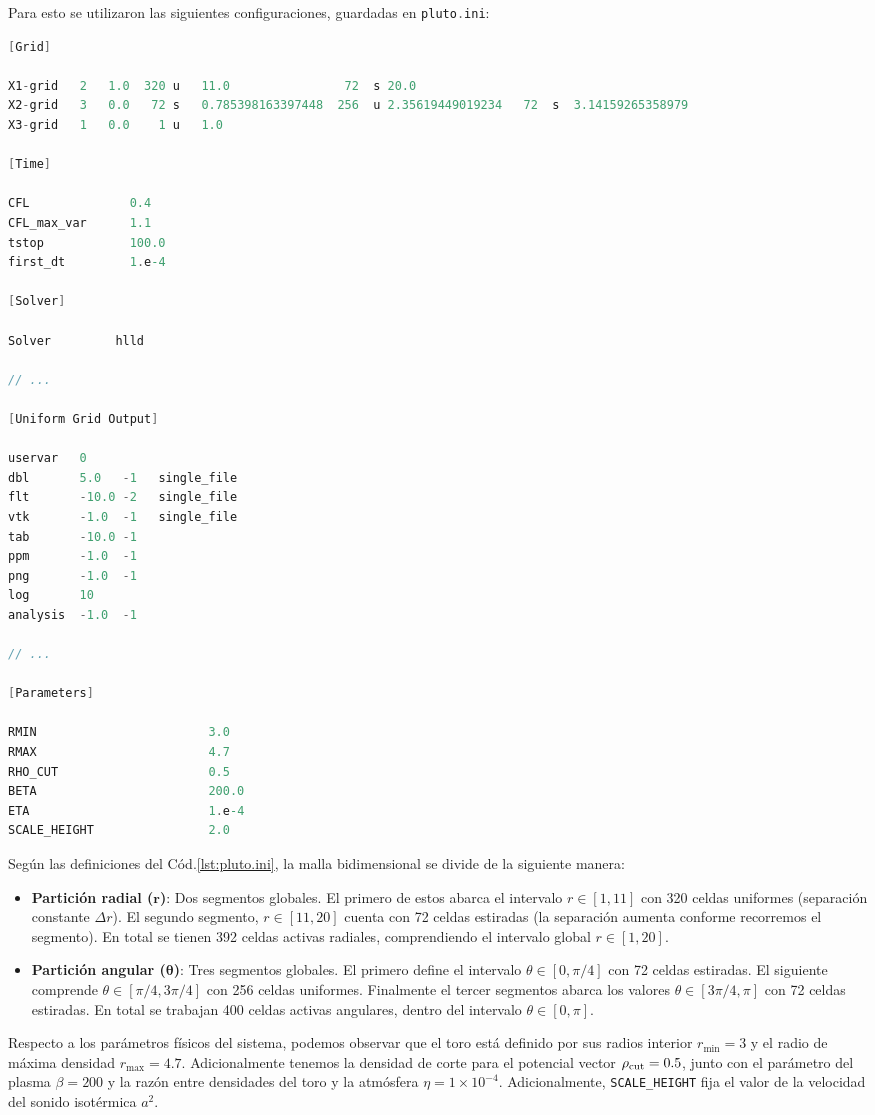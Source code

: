 \documentclass[11pt, letterpaper]{article}
\begin{document}
Para esto se utilizaron las siguientes configuraciones, guardadas en \lstinline[language=C]{pluto.ini}:
\begin{lstlisting}[language=C, caption={Parámetros de grilla, tiempo y solucionador para simulación del toro por PLUTO}, label={lst:pluto.ini}]
[Grid]

X1-grid   2   1.0  320 u   11.0                72  s 20.0
X2-grid   3   0.0   72 s   0.785398163397448  256  u 2.35619449019234   72  s  3.14159265358979
X3-grid   1   0.0    1 u   1.0

[Time]

CFL              0.4
CFL_max_var      1.1
tstop            100.0
first_dt         1.e-4

[Solver]

Solver         hlld

// ...

[Uniform Grid Output]

uservar   0
dbl       5.0   -1   single_file
flt       -10.0 -2   single_file
vtk       -1.0  -1   single_file
tab       -10.0 -1   
ppm       -1.0  -1   
png       -1.0  -1   
log       10 
analysis  -1.0  -1 
  
// ...

[Parameters]

RMIN                        3.0  
RMAX                        4.7  
RHO_CUT                     0.5  
BETA                        200.0  
ETA                         1.e-4  
SCALE_HEIGHT                2.0  
\end{lstlisting}
Según las definiciones del Cód.\ref{lst:pluto.ini}, la malla bidimensional se divide de la siguiente manera:
\begin{itemize}
    \item \textbf{Partición radial ($\mathbf{r}$)}: Dos segmentos globales. El primero de estos abarca el intervalo $r \in [1, 11]$ con 320 celdas uniformes (separación constante $\Delta r$). El segundo segmento, $r \in [11, 20]$ cuenta con 72 celdas estiradas (la separación aumenta conforme recorremos el segmento). En total se tienen 392 celdas activas radiales, comprendiendo el intervalo global $r \in [1, 20]$.
    \item \textbf{Partición angular ($\mathbf{\theta}$)}: Tres segmentos globales. El primero define el intervalo $\theta \in [0, \pi/4]$ con 72 celdas estiradas. El siguiente comprende $\theta \in [\pi/4, 3\pi/4]$ con 256 celdas uniformes. Finalmente el tercer segmentos abarca los valores $\theta \in [3\pi/4, \pi]$ con 72 celdas estiradas. En total se trabajan 400 celdas activas angulares, dentro del intervalo $\theta \in [0, \pi]$.
\end{itemize}
Respecto a los parámetros físicos del sistema, podemos observar que el toro está definido por sus radios interior $r_{\min} = 3$ y el radio de máxima densidad $r_{\max} = 4.7$. Adicionalmente tenemos la densidad de corte para el potencial vector $\rho_{\rm cut} = 0.5$, junto con el parámetro del plasma $\beta = 200$ y la razón entre densidades del toro y la atmósfera $\eta = 1\times10^{-4}$. Adicionalmente, \lstinline[language=C]|SCALE_HEIGHT| fija el valor de la velocidad del sonido isotérmica $a^2$.
\end{document}

